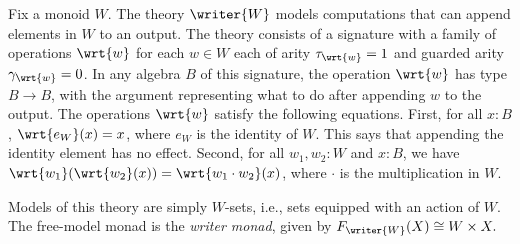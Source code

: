 \documentclass[acmsmall,screen,review,anonymous]{acmart}
\theoremstyle{remark}
\begin{document}
\begin{example}[Writer]\label{ex:writer} Fix a monoid $W$. The theory
  $\writer{W}$ models computations that can append elements in $W$ to an output.
  The theory consists of a signature with a family of operations $\wrt{w}$ for
  each $w \in W$ each of arity $\tau_{\wrt{w}} = 1$ and guarded arity
  $\gamma_{\wrt{w}} = 0$. In any algebra $B$ of this signature, the operation
  $\wrt{w}$ has type $B \to B$, with the argument representing what to do after
  appending $w$ to the output.
  The operations $\wrt{w}$ satisfy the following equations. First, for all $x :
  B$, $\wrt{e_W}(x) = x$, where $e_W$ is the identity of $W$. This says that
  appending the identity element has no effect. Second, for all $w_1, w_2 : W$
  and $x : B$, we have $\wrt{w_1}(\wrt{w_2}(x)) = \wrt{w_1 \cdot w_2}(x)$, where
  $\cdot$ is the multiplication in $W$.

  Models of this theory are simply $W$-sets, i.e., sets equipped with an action
  of $W$. The free-model monad is the \emph{writer monad}, given by
  $F_{\writer{W}}(X) \cong W \times X.$
\end{example}
\end{document}
